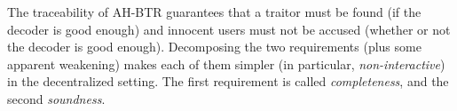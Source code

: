 The traceability of AH-BTR guarantees that a traitor must be found (if the decoder is good enough) and innocent users must not be accused (whether or not the decoder is good enough).
Decomposing the two requirements (plus some apparent weakening) makes each of them simpler (in particular, \emph{non-interactive}) in the decentralized setting.
The first requirement is called \emph{completeness}, and the second \emph{soundness}.
